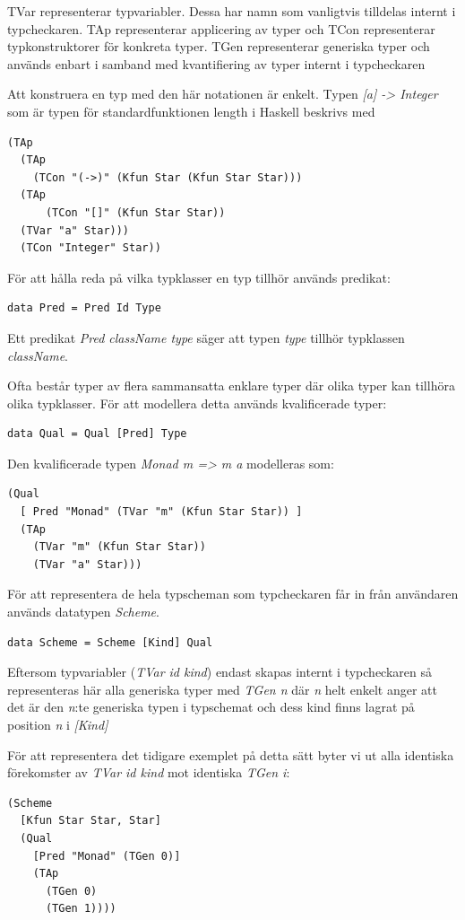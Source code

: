 TVar representerar typvariabler. Dessa har namn som vanligtvis tilldelas internt i typcheckaren. TAp representerar applicering av typer och TCon representerar typkonstruktorer för konkreta typer. TGen representerar
generiska typer och används enbart i samband med kvantifiering av
typer internt i typcheckaren

Att konstruera en typ med den här notationen är enkelt. Typen \emph{[a] ->
Integer} som är typen för standardfunktionen length i Haskell beskrivs med
\begin{lstlisting}
(TAp
  (TAp
    (TCon "(->)" (Kfun Star (Kfun Star Star)))
  (TAp
      (TCon "[]" (Kfun Star Star))
  (TVar "a" Star)))
  (TCon "Integer" Star))
\end{lstlisting}

För att hålla reda på vilka typklasser en typ tillhör används predikat:
\begin{lstlisting}
data Pred = Pred Id Type
\end{lstlisting}
Ett predikat \emph{Pred className type} säger att typen \emph{type} tillhör typklassen \emph{className}.

Ofta består typer av flera sammansatta enklare typer där olika typer kan tillhöra olika typklasser. För att modellera detta används kvalificerade typer:
\begin{lstlisting}
data Qual = Qual [Pred] Type
\end{lstlisting}

Den kvalificerade typen \emph{Monad m => m a} modelleras som:
\begin{lstlisting}
(Qual
  [ Pred "Monad" (TVar "m" (Kfun Star Star)) ]
  (TAp
    (TVar "m" (Kfun Star Star))
    (TVar "a" Star)))
\end{lstlisting}

För att representera de hela typscheman som typcheckaren får in från användaren används datatypen \emph{Scheme}.
\begin{lstlisting}
data Scheme = Scheme [Kind] Qual
\end{lstlisting}
Eftersom typvariabler (\emph{TVar id kind}) endast skapas internt i typcheckaren så representeras här alla generiska typer med \emph{TGen n} där \emph{n} helt enkelt anger att det är den \emph{n}:te generiska typen i typschemat och dess kind finns lagrat på position \emph{n} i \emph{[Kind]}

För att representera det tidigare exemplet på detta sätt byter vi ut alla identiska förekomster av \emph{TVar id kind} mot identiska \emph{TGen i}:
\begin{lstlisting}
(Scheme
  [Kfun Star Star, Star]
  (Qual
    [Pred "Monad" (TGen 0)]
    (TAp
      (TGen 0)
      (TGen 1))))
\end{lstlisting}

